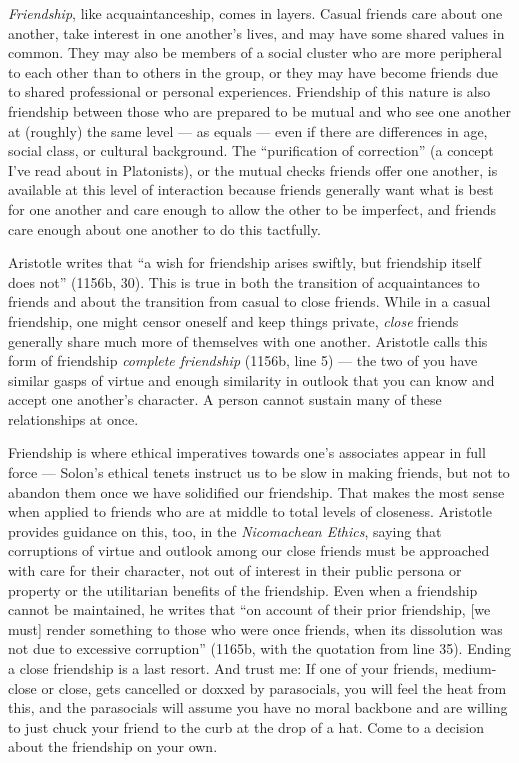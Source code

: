 \documentclass[
]{book}
\begin{document}
\emph{Friendship}, like acquaintanceship, comes in layers. Casual friends care about one another, take interest in one another's lives, and may have some shared values in common. They may also be members of a social cluster who are more peripheral to each other than to others in the group, or they may have become friends due to shared professional or personal experiences. Friendship of this nature is also friendship between those who are prepared to be mutual and who see one another at (roughly) the same level --- as equals --- even if there are differences in age, social class, or cultural background. The ``purification of correction'' (a concept I've read about in Platonists), or the mutual checks friends offer one another, is available at this level of interaction because friends generally want what is best for one another and care enough to allow the other to be imperfect, and friends care enough about one another to do this tactfully.

Aristotle writes that ``a wish for friendship arises swiftly, but friendship itself does not'' (1156b, 30). This is true in both the transition of acquaintances to friends and about the transition from casual to close friends. While in a casual friendship, one might censor oneself and keep things private, \emph{close} friends generally share much more of themselves with one another. Aristotle calls this form of friendship \emph{complete friendship} (1156b, line 5) --- the two of you have similar gasps of virtue and enough similarity in outlook that you can know and accept one another's character. A person cannot sustain many of these relationships at once.

Friendship is where ethical imperatives towards one's associates appear in full force --- Solon's ethical tenets instruct us to be slow in making friends, but not to abandon them once we have solidified our friendship. That makes the most sense when applied to friends who are at middle to total levels of closeness. Aristotle provides guidance on this, too, in the \emph{Nicomachean Ethics}, saying that corruptions of virtue and outlook among our close friends must be approached with care for their character, not out of interest in their public persona or property or the utilitarian benefits of the friendship. Even when a friendship cannot be maintained, he writes that ``on account of their prior friendship, {[}we must{]} render something to those who were once friends, when its dissolution was not due to excessive corruption'' (1165b, with the quotation from line 35). Ending a close friendship is a last resort. And trust me: If one of your friends, medium-close or close, gets cancelled or doxxed by parasocials, you will feel the heat from this, and the parasocials will assume you have no moral backbone and are willing to just chuck your friend to the curb at the drop of a hat. Come to a decision about the friendship on your own.
\end{document}
